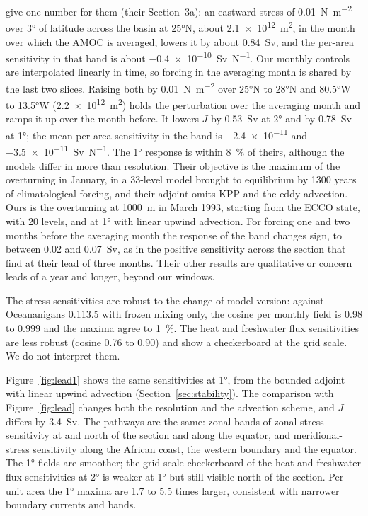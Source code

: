 \documentclass[11pt]{article}
\begin{document}
\citet{pillar2016} give one number for them (their Section~3a): an eastward stress of \SI{0.01}{N.m^{-2}} over
\ang{3} of latitude across the basin at \ang{25}N, about \SI{2.1e12}{m^2}, in the month over which the AMOC is
averaged, lowers it by about \SI{0.84}{Sv}, and the per-area sensitivity in that band is about
\SI{-0.4e-10}{Sv.N^{-1}}. Our monthly controls are interpolated linearly in time, so forcing in the averaging month
is shared by the last two slices. Raising both by \SI{0.01}{N.m^{-2}} over \ang{25}N to \ang{28}N and \ang{80.5}W
to \ang{13.5}W (\SI{2.2e12}{m^2}) holds the perturbation over the averaging month and ramps it up over the month
before. It lowers $J$ by \SI{0.53}{Sv} at \ang{2} and by \SI{0.78}{Sv} at \ang{1}; the mean per-area sensitivity in
the band is \num{-2.4e-11} and \SI{-3.5e-11}{Sv.N^{-1}}. The \ang{1} response is within \SI{8}{\percent} of theirs,
although the models differ in more than resolution. Their objective is the maximum of the overturning in January,
in a 33-level model brought to equilibrium by 1300 years of climatological forcing, and their adjoint omits KPP and
the eddy advection. Ours is the overturning at \SI{1000}{m} in March 1993, starting from the ECCO state, with
20 levels, and at \ang{1} with linear upwind advection. For forcing one and two months before the averaging month
the response of the band changes sign, to between \num{+0.02} and \SI{+0.07}{Sv}, as in the positive sensitivity
across the section that \citet{pillar2016} find at their lead of three months. Their other results are
qualitative or concern leads of a year and longer, beyond our windows.

The stress sensitivities are robust to the change of model version: against Oceananigans 0.113.5 with frozen mixing
only, the cosine per monthly field is 0.98 to 0.999 and the maxima agree to \SI{1}{\percent}. The heat and
freshwater flux sensitivities are less robust (cosine 0.76 to 0.90) and show a checkerboard at the grid scale. We
do not interpret them.

Figure~\ref{fig:lead1} shows the same sensitivities at \ang{1}, from the bounded adjoint with linear upwind
advection (Section~\ref{sec:stability}). The comparison with Figure~\ref{fig:lead} changes both the resolution and
the advection scheme, and $J$ differs by \SI{3.4}{Sv}. The pathways are the same: zonal bands of zonal-stress
sensitivity at and north of the section and along the equator, and meridional-stress sensitivity along the African
coast, the western boundary and the equator. The \ang{1} fields are smoother; the grid-scale checkerboard of the
heat and freshwater flux sensitivities at \ang{2} is weaker at \ang{1} but still visible north of the section. Per
unit area the \ang{1} maxima are 1.7 to 5.5 times larger, consistent with narrower boundary currents and bands.
\end{document}

